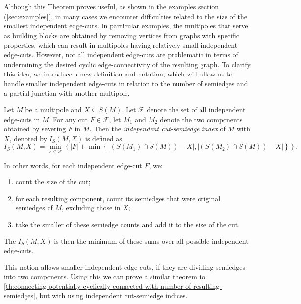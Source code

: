 \documentclass[12pt, twoside]{book}
\begin{document}
Although this Theorem proves useful, as shown in the examples section (\cref{sec:examples}), in many cases we encounter difficulties related to the size of the smallest independent edge-cuts. In particular examples, the multipoles that serve as building blocks are obtained by removing vertices from graphs with specific properties, which can result in multipoles having relatively small independent edge-cuts. However, not all independent edge-cuts are problematic in terms of undermining the desired cyclic edge-connectivity of the resulting graph. To clarify this idea, we introduce a new definition and notation, which will allow us to handle smaller independent edge-cuts in relation to the number of semiedges and a partial junction with another multipole.

\begin{definition}
	Let $M$ be a multipole and $X\subseteq S(M)$.  Let $\mathcal{F}$ denote the set of all independent edge-cuts in $M$. For any cut $F\in\mathcal{F}$, let $M_1$ and $M_2$ denote the two components obtained by severing $F$ in $M$. Then the \textit{independent cut-semiedge index} of $M$ with $X$, denoted by $I_S(M, X)$ is defined as
	$$I_S(M, X)=\min\limits_{F\in\mathcal{F}} \left\{|F|+\min\left\{\left|\left(S(M_1)\cap S(M)\right)-X\right|, \left|\left(S(M_2)\cap S(M)\right)-X\right|\right\}\right\}.$$
\end{definition}

In other words, for each independent edge-cut $F$, we:
\begin{enumerate}
	\item count the size of the cut;
	\item for each resulting component, count its semiedges that were original semiedges of $M$, excluding those in $X$;
	\item take the smaller of these semiedge counts and add it to the size of the cut.
\end{enumerate}
The $I_S(M, X)$ is then the minimum of these sums over all possible independent edge-cuts.

This notion allows smaller independent edge-cuts, if they are dividing semiedges into two components. Using this we can prove a similar theorem to \cref{th:connecting-potentially-cyclically-connected-with-number-of-resulting-semiedges}, but with using independent cut-semiedge indices.
\end{document}
